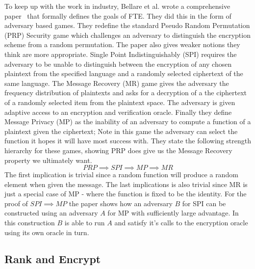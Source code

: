 \documentclass[ %
                    author={Samuel Russell},
                supervisor={Prof. Bogdan Warinschi},
                    degree={MEng},
                     title={Innocuous Ciphertexts},
                  subtitle={The DE-CENSOR Scheme},
                      type={research},
                      year={2018} ]{dissertation}
\begin{document}
To keep up with the work in industry, Bellare et al. wrote a comprehensive paper~\cite{fpe} that formally defines the goals of FTE. They did this in the form of adversary based games. They redefine the standard Pseudo Random Permutation (PRP) Security game which challenges an adversary to distinguish the encryption scheme from a random permutation. The paper also gives weaker notions they think are more appropriate. Single Point Indistinguishably (SPI) requires the adversary to be unable to distinguish between the encryption of any chosen plaintext from the specified language and a randomly selected ciphertext of the same language. The Message Recovery (MR) game gives the adversary the frequency distribution of plaintexts and asks for a decryption of a the ciphertext of a randomly selected item from the plaintext space. The adversary is given adaptive access to an encryption and verification oracle. Finally they define Message Privacy (MP) as the inability of an adversary to compute a function of a plaintext given the ciphertext; Note in this game the adversary can select the function it hopes it will have most success with. They state the following strength hierarchy for these games, showing PRP does give us the Message Recovery property we ultimately want.
$$ PRP \implies SPI \implies MP \implies MR $$
The first implication is trivial since a random function will produce a random element when given the message. The last implications is also trivial since MR is just a special case of MP - where the function is fixed to be the identity. For the proof of $ SPI \implies MP $ the paper shows how an adversary $B$ for SPI can be constructed using an adversary $A$ for MP with sufficiently large advantage. In this construction $B$ is able to run $A$ and satisfy it's calls to the encryption oracle using its own oracle in turn.

\subsection{Rank and Encrypt}
\end{document}
